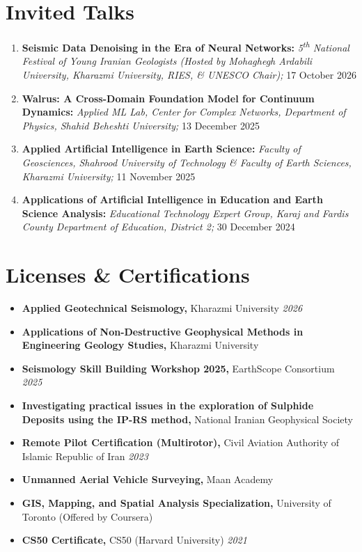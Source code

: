 \documentclass[letterpaper,10pt]{article}
\begin{document}
	\vspace{-1.06em}
		
	\section{Invited Talks}
	\begin{enumerate}[label=\arabic*., left=0pt, topsep=1pt, partopsep=0pt, itemsep=1.5pt, parsep=0pt]
		\item \textbf{Seismic Data Denoising in the Era of Neural Networks:} \textit{5\textsuperscript{th} National Festival of Young Iranian Geologists (Hosted by Mohaghegh Ardabili University, Kharazmi University, RIES, \& UNESCO Chair);} 17 October 2026
		\item \textbf{Walrus: A Cross-Domain Foundation Model for Continuum Dynamics:} \textit{Applied ML Lab, Center for Complex Networks, Department of Physics, Shahid Beheshti University;} 13 December 2025
		\item \textbf{Applied Artificial Intelligence in Earth Science:} \textit{Faculty of Geosciences, Shahrood University of Technology \& Faculty of Earth Sciences, Kharazmi University;} 11 November 2025
		\item \textbf{Applications of Artificial Intelligence in Education and Earth Science Analysis:} \textit{Educational Technology Expert Group, Karaj and Fardis County Department of Education, District 2;} 30 December 2024
	\end{enumerate}

		\vspace{-0.95em}
	
	\section{Licenses \& Certifications}
	\begin{itemize}[left=0pt, label={}, topsep=1pt, partopsep=0pt, itemsep=1pt, parsep=0pt]
		\item \textbf{Applied Geotechnical Seismology,} Kharazmi University \hfill \textit{2026}
		\item \textbf{Applications of Non-Destructive Geophysical Methods in Engineering Geology Studies,} Kharazmi University
		\item \textbf{Seismology Skill Building Workshop 2025,} EarthScope Consortium \hfill \textit{2025}
		\item \textbf{Investigating practical issues in the exploration of Sulphide Deposits using the IP-RS method,} National Iranian Geophysical Society
		\item \textbf{Remote Pilot Certification (Multirotor),} Civil Aviation Authority of Islamic Republic of Iran \hfill \textit{2023}
		\item \textbf{Unmanned Aerial Vehicle Surveying,} Maan Academy
		\item \textbf{GIS, Mapping, and Spatial Analysis Specialization,} University of Toronto (Offered by Coursera)
		\item \textbf{CS50 Certificate,} CS50 (Harvard University) \hfill \textit{2021}
	\end{itemize}
\end{document}
